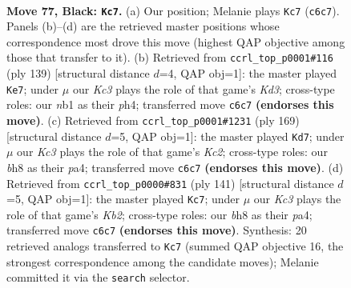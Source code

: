 \documentclass[11pt]{article}
\begin{document}
\clearpage

\begin{figure}[p]\centering
\begin{subfigure}{0.46\textwidth}\centering
\resizebox{\linewidth}{!}{%
\newchessgame
\chessboard[
  setfen={7B/8/2k5/8/p1p3b1/8/5K2/1N6 b - - 9 77},
  showmover=false,
  pgfstyle=straightmove, color=movearrow, markmove={c6-c7}
]}
\caption{}
\end{subfigure}\hfill
\begin{subfigure}{0.46\textwidth}\centering
\resizebox{\linewidth}{!}{%
\newchessgame
\chessboard[
  setfen={8/8/3k3p/8/1p2K2P/1B6/1b6/8 b - - 0 70},
  showmover=false,
  pgfstyle=straightmove, color=movearrow, markmove={d6-e7}
]}
\caption{}
\end{subfigure}
\\[4pt]
\begin{subfigure}{0.46\textwidth}\centering
\resizebox{\linewidth}{!}{%
\newchessgame
\chessboard[
  setfen={8/2k5/8/p7/P7/3N4/K3p3/8 b - - 15 85},
  showmover=false,
  pgfstyle=straightmove, color=movearrow, markmove={c7-d7}
]}
\caption{}
\end{subfigure}\hfill
\begin{subfigure}{0.46\textwidth}\centering
\resizebox{\linewidth}{!}{%
\newchessgame
\chessboard[
  setfen={8/1k6/8/p2K4/P7/8/2N1p3/8 b - - 9 71},
  showmover=false,
  pgfstyle=straightmove, color=movearrow, markmove={b7-c7}
]}
\caption{}
\end{subfigure}
\caption{\textbf{Move 77, Black: \texttt{Kc7}.} (a) Our position; Melanie plays \texttt{Kc7} (\texttt{c6c7}). Panels (b)--(d) are the retrieved master positions whose correspondence most drove this move (highest QAP objective among those that transfer to it). (b) Retrieved from \texttt{ccrl\_top\_p0001\#116} (ply 139) [structural distance $d$=4, QAP obj=1]: the master played \texttt{Ke7}; under $\mu$ our \emph{Kc3} plays the role of that game's \emph{Kd3}; cross-type roles: our \emph{n}b1 as their \emph{p}h4; transferred move \texttt{c6c7} \textbf{(endorses this move)}. (c) Retrieved from \texttt{ccrl\_top\_p0001\#1231} (ply 169) [structural distance $d$=5, QAP obj=1]: the master played \texttt{Kd7}; under $\mu$ our \emph{Kc3} plays the role of that game's \emph{Kc2}; cross-type roles: our \emph{b}h8 as their \emph{p}a4; transferred move \texttt{c6c7} \textbf{(endorses this move)}. (d) Retrieved from \texttt{ccrl\_top\_p0000\#831} (ply 141) [structural distance $d$=5, QAP obj=1]: the master played \texttt{Kc7}; under $\mu$ our \emph{Kc3} plays the role of that game's \emph{Kb2}; cross-type roles: our \emph{b}h8 as their \emph{p}a4; transferred move \texttt{c6c7} \textbf{(endorses this move)}. Synthesis: 20 retrieved analogs transferred to \texttt{Kc7} (summed QAP objective 16, the strongest correspondence among the candidate moves); Melanie committed it via the \texttt{search} selector.}
\label{fig:thought-m153}
\end{figure}
\end{document}
